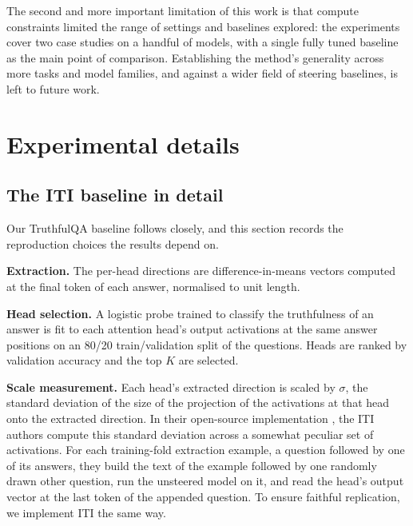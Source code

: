 \documentclass[logo,msc,notimes]{infthesis}
\newif\ifdraftnotes
\newcounter{todocount}
\newcommand{\todo}[1]{%
  \ifdraftnotes
    \stepcounter{todocount}%
    \addcontentsline{tdo}{todoitem}{\protect\numberline{\thetodocount}#1}%
    \textcolor{todored}{\textbf{[TODO~\thetodocount]}~#1}%
  \fi}
\begin{document}
The second and more important limitation of this work is that compute constraints limited the range of settings and baselines explored: the experiments cover two case studies on a handful of models, with a single fully tuned baseline as the main point of comparison. Establishing the method's generality across more tasks and model families, and against a wider field of steering baselines, is left to future work.

\todo{check citations}




\appendix

\chapter{Experimental details}\label{app:expdetails}

\section{The ITI baseline in detail}\label{app:iti}
Our TruthfulQA baseline follows \citet{li2023iti} closely, and this section records the reproduction choices
the results depend on. 

\textbf{Extraction.} The per-head directions are difference-in-means vectors
computed at the final token of each answer, normalised to unit length. 

\textbf{Head selection.} A logistic probe trained to classify the truthfulness of an answer is
fit to each attention head's output activations at the same answer positions on an 80/20 train/validation split of
the questions. Heads are ranked by validation accuracy and the top $K$ are selected.

\textbf{Scale measurement.} Each head's extracted direction is scaled by $\sigma$, the standard deviation of the size of the projection of the activations at that head onto the extracted direction. In their open-source implementation \citep{honestllama2023}, the ITI authors compute this standard deviation across a somewhat peculiar set of activations.
For each training-fold extraction example, a question followed by one of its answers, they build
the text of the example followed by one randomly drawn other question, run the unsteered model on
it, and read the head's output vector at the last token of the appended question. To ensure faithful replication, we implement ITI the same way.
\end{document}
